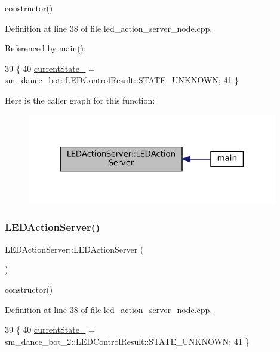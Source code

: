 constructor() 

Definition at line 38 of file led\+\_\+action\+\_\+server\+\_\+node.\+cpp.



Referenced by main().


\begin{DoxyCode}
39   \{
40     \hyperlink{classLEDActionServer_a1dc456e987dc331501ad6ff2215661ff}{currentState\_} =  sm\_dance\_bot::LEDControlResult::STATE\_UNKNOWN;
41   \}
\end{DoxyCode}
Here is the caller graph for this function\+:
\nopagebreak
\begin{figure}[H]
\begin{center}
\leavevmode
\includegraphics[width=310pt]{classLEDActionServer_a6978c43940438b9fd8bfcd6b443092d3_icgraph}
\end{center}
\end{figure}
\mbox{\label{classLEDActionServer_a6978c43940438b9fd8bfcd6b443092d3}} 
\subsubsection{\texorpdfstring{L\+E\+D\+Action\+Server()}{LEDActionServer()}\hspace{0.1cm}{\footnotesize\ttfamily [2/3]}}
{\footnotesize\ttfamily L\+E\+D\+Action\+Server\+::\+L\+E\+D\+Action\+Server (\begin{DoxyParamCaption}{ }\end{DoxyParamCaption})\hspace{0.3cm}{\ttfamily [inline]}}

constructor() 

Definition at line 38 of file led\+\_\+action\+\_\+server\+\_\+node.\+cpp.


\begin{DoxyCode}
39   \{
40     \hyperlink{classLEDActionServer_a1dc456e987dc331501ad6ff2215661ff}{currentState\_} =  sm\_dance\_bot\_2::LEDControlResult::STATE\_UNKNOWN;
41   \}
\end{DoxyCode}
\mbox{\label{classLEDActionServer_a6978c43940438b9fd8bfcd6b443092d3}} 
